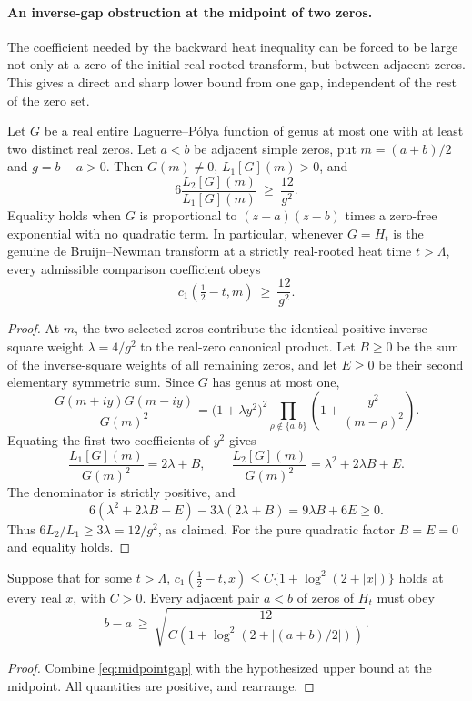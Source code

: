 \paragraph{An inverse-gap obstruction at the midpoint of two zeros.}
\label{par:midpoint-spatial}
The coefficient needed by the backward heat inequality
can be forced to be large not only at a zero of the initial
real-rooted transform, but between adjacent zeros.
This gives a direct and sharp lower bound from one
gap, independent of the rest of the zero set.

\begin{theorem}
\label{thm:midpointgap}
Let $G$ be a real entire Laguerre--P\'olya function
of genus at most one with at least two distinct
real zeros. Let $a<b$ be adjacent simple zeros,
put $m=(a+b)/2$ and $g=b-a>0$.
Then $G(m)\ne0$, $L_1[G](m)>0$, and
\begin{equation}
\boxed{\quad
6\frac{L_2[G](m)}{L_1[G](m)}
\ \ge\ \frac{12}{g^2}.
\quad}
\label{eq:midpointgap}
\end{equation}
Equality holds when $G$ is proportional to
$(z-a)(z-b)$ times a zero-free exponential
with no quadratic term.
In particular, whenever $G=H_t$ is
the genuine de Bruijn--Newman transform at a
strictly real-rooted heat time $t>\Lambda$,
every admissible comparison coefficient obeys
\[
c_1(\tfrac12-t,m)\ \ge\ \frac{12}{g^2}.
\]
\end{theorem}
\begin{proof}
At $m$, the two selected zeros contribute
the identical positive inverse-square weight
$\lambda=4/g^2$ to the real-zero canonical
product. Let $B\ge0$ be the sum of the
inverse-square weights of all remaining zeros,
and let $E\ge0$ be their second elementary
symmetric sum. Since $G$ has genus at most one,
\[
\frac{G(m+iy)G(m-iy)}{G(m)^2}
=\bigl(1+\lambda y^2\bigr)^2
\prod_{\rho\notin\{a,b\}}
\left(1+\frac{y^2}{(m-\rho)^2}\right).
\]
Equating the first two coefficients of $y^2$
gives
\[
\frac{L_1[G](m)}{G(m)^2}=2\lambda+B,
\qquad
\frac{L_2[G](m)}{G(m)^2}
=\lambda^2+2\lambda B+E.
\]
The denominator is strictly positive, and
\[
6(\lambda^2+2\lambda B+E)
-3\lambda(2\lambda+B)
=9\lambda B+6E\ge0.
\]
Thus $6L_2/L_1\ge3\lambda=12/g^2$,
as claimed. For the pure quadratic factor
$B=E=0$ and equality holds.
\end{proof}

\begin{corollary}
\label{cor:midpointspacing}
Suppose that for some $t>\Lambda$,
$c_1(\tfrac12-t,x)\le C\{1+\log^2(2+|x|)\}$
holds at every real $x$, with $C>0$.
Every adjacent pair $a<b$ of zeros of $H_t$ must obey
\begin{equation}
\boxed{
b-a\ \ge\
\sqrt{\frac{12}{C\left(1+\log^2(2+|(a+b)/2|)\right)}}.
}
\label{eq:midpointspacing}
\end{equation}
\end{corollary}
\begin{proof}
Combine \eqref{eq:midpointgap} with
the hypothesized upper bound at the midpoint.
All quantities are positive, and rearrange.
\end{proof}

